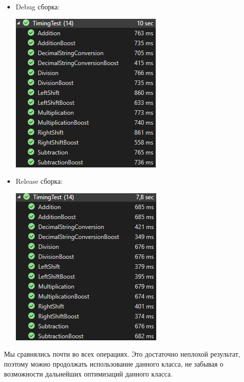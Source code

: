 \begin{itemize}
  \item Debug сборка:

  \begin{center}
     \includegraphics{images/uint_debug.png}
  \end{center}

  \item Release сборка:

  \begin{center}
     \includegraphics{images/uint_release.png}
  \end{center}
\end{itemize}

Мы сравнялись почти во всех операциях. Это достаточно неплохой результат, поэтому можно продолжать использование данного класса, не забывая о возможности дальнейших оптимизаций данного класса.

